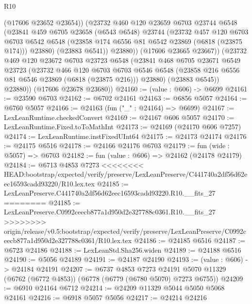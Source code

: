\begin{lexlean}{R10}
\begin{coremodule}
{{{{{{{{{{{{{{{{{{{{{{{{{{{{{{{{{{{{{{{{{{{{{{{{{{{{{{{{{{{{{{{{{{{{{{{{{{{{{{{{{{{{              (@17606 @23652 @23654))
            (@23732
              @460
              @120
              @23659
              @6703
              @23744
              @6548
              (@23841
                @459
                @6705
                @23658
                (@6543 @6548)
                @23744
                (@23732
                  @457
                  @120
                  @6703
                  @6703
                  @6542
                  @6548
                  (@23858 @174 @6556 @81 @6542 @23869 (@6818 (@23875 @174)))
                  @23880)
                (@23883 @6541))
              @23880))
          (@17606 @23665 @23667))
        (@23732
          @469
          @120
          @23672
          @6703
          @23723
          @6548
          (@23841
            @468
            @6705
            @23671
            @6549
            @23723
            (@23732
              @466
              @120
              @6703
              @6703
              @6546
              @6548
              (@23858 @216 @6556 @81 @6546 @23869 (@6818 (@23875 @216)))
              @23880)
            (@23883 @6545))
          @23880))
      (@17606 @23678 @23680))
@24160 := (value : @606) -> @6699
@24161 := @23590 @6703
@24162 := @6702 @24161
@24163 := @6856 @5057
@24164 := @6760 @5057
@24166 := @24163 (fun ("_" : @24164) => @6699)
@24167 := LexLeanRuntime.checkedConvert
@24169 := @24167 @606 @5057
@24170 := LexLeanRuntime.Fixed.toToMathInt
@24173 := @24169 (@24170 @606 @7257)
@24174 := LexLeanRuntime.instFixedUInt64
@24175 := @24173 @24174
@24176 := @24175 @6516
@24178 := @24166 @24176 @6703
@24179 := fun (wide : @5057) => @6703
@24182 := fun (value : @606) => @24162 (@24178 @24179)
@24184 := @6713 @4853 @7273
<<<<<<<< HEAD:bootstrap/expected/verify/preserve/LexLeanPreserve/C441740a2df56d62eec16593cadd93220/R10.lex.tex
@24185 := LexLeanPreserve.C441740a2df56d62eec16593cadd93220.R10.__fits_27
========
@24185 := LexLeanPreserve.C0992ceecb877a1d950d2e327788c0361.R10.__fits_27
>>>>>>>> origin/release/v0.5:bootstrap/expected/verify/preserve/LexLeanPreserve/C0992ceecb877a1d950d2e327788c0361/R10.lex.tex
@24186 := @24185 @6516
@24187 := @6723 @24186
@24188 := LexLeanStd.Sha256.widen
@24189 := @24188 @6516
@24190 := @5056 @24189
@24191 := @24187 @24190
@24193 := (value : @606) -> @24184 @24191
@24207 := @6737
    @4853
    @7273
    @24191
    @5070
    @11329
    (@6762 (@6772 @4853))
    (@6778 (@6779 (@6780 @5070) @7273 @6755))
@24209 := @6910 @24164 @6712
@24214 := @24209 @11329 @5044 @5050 @5068 @24161
@24216 := @6918 @5057 @5056
@24217 := @24214 @24216
}}}}}}}}}}}}}}}}}}}}}}}}}}}}}}}}}}}}}}}}}}}}}}}}}}}}}}}}}}}}}}}}}}}}}}}}}}}}}}}}}}}}
\end{coremodule}
\end{lexlean}
